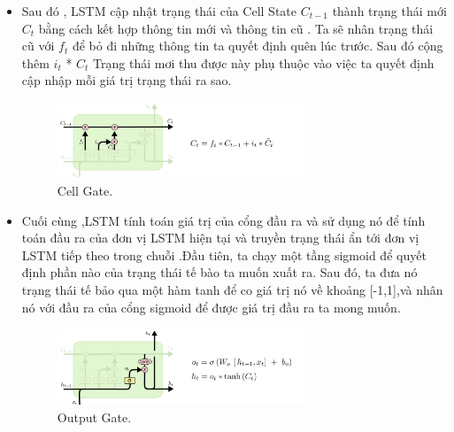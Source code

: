 \begin{itemize}
    \item Sau đó , LSTM cập nhật trạng thái của Cell State \( C_{t-1} \) thành trạng thái mới \( C_{t} \) bằng cách kết hợp thông tin mới và thông tin cũ . Ta sẽ nhân trạng thái cũ với \( f_{t} \) để bỏ đi những thông tin ta quyết định quên lúc trước. Sau đó cộng thêm \( i_{t} \) * \( C_{t} \)  Trạng thái mơi thu được này phụ thuộc vào việc ta quyết định cập nhập mỗi giá trị trạng thái ra sao.
    \begin{figure}[h!]
	\centering
	\includegraphics[width=0.7\textwidth]{Figures/LSTM3-focus-C.png}
	\caption[Cell Gate.]{Cell Gate.}
	\label{LSTM3-focus-C.png} 
\end{figure}
    \item Cuối cùng ,LSTM tính toán giá trị của cổng đầu ra và sử dụng nó để tính toán đầu ra của đơn vị LSTM hiện tại và truyền trạng thái ẩn tới đơn vị LSTM tiếp theo trong chuỗi .Đầu tiên, ta chạy một tầng sigmoid để quyết định phần nào của trạng thái tế bào ta muốn xuất ra. Sau đó, ta đưa nó trạng thái tế bảo qua một hàm tanh để co giá trị nó về khoảng [-1,1],và nhân nó với đầu ra của cổng sigmoid để được giá trị đầu ra ta mong muốn.
    \begin{figure}[h!]
	\centering
	\includegraphics[width=0.7\textwidth]{Figures/LSTM3-focus-o.png}
	\caption[Output Gate.]{Output Gate.}
	\label{LSTM3-focus-C.png} 
\end{figure}
\end{itemize}
